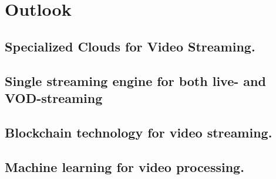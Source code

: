 
\chapter{Outlook}\label{chapter:outlook}

\section{Specialized Clouds for Video Streaming.}
\section{Single streaming engine for both live- and VOD-streaming}
\section{Blockchain technology for video streaming.}
\section{Machine learning for video processing.}